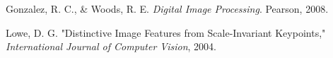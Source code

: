 


\begin{thebibliography}{9}

    Gonzalez, R. C., \& Woods, R. E. \textit{Digital Image Processing}. Pearson, 2008.
    
    Lowe, D. G. "Distinctive Image Features from Scale-Invariant Keypoints," \textit{International Journal of Computer Vision}, 2004.
    
    \end{thebibliography}


